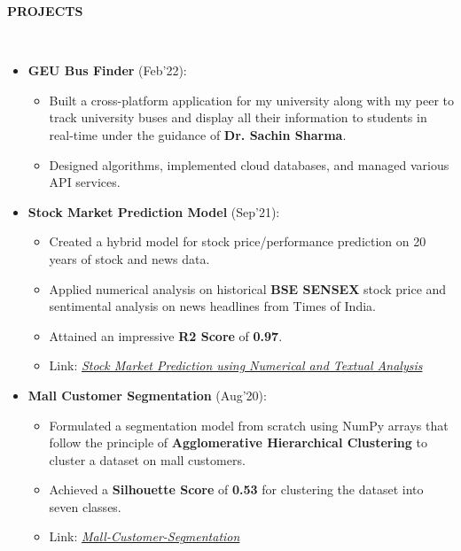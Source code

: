 \documentclass[a4paper,10pt]{article}
\newcommand{\lsep}{-0.5cm}
\newcommand{\resheading}[1]{{\small \colorbox{mygrey}{\begin{minipage}{0.98\textwidth}{\textbf{#1 \vphantom{p\^{E}}}}\end{minipage}}}}
\begin{document}
\resheading{\textbf{PROJECTS} }\\[\lsep]
\begin{itemize}[itemsep=0.01mm, parsep=0.1pt]

\item \textbf{GEU Bus Finder} (Feb'22): 
\begin{itemize}[itemsep=0.01mm, parsep=2pt]
\item Built a cross-platform application for my university along with my peer to track university buses and display all their information to students in real-time under the guidance of \textbf{Dr. Sachin Sharma}.
\item Designed algorithms, implemented cloud databases, and managed various API services.
\end{itemize}

\item \textbf{Stock Market Prediction Model} (Sep'21): 
\begin{itemize}[itemsep=0.01mm, parsep=2pt]
\item Created a hybrid model for stock price/performance prediction on 20 years of stock and news data.
\item Applied numerical analysis on historical \textbf{BSE SENSEX} stock price and sentimental analysis on news headlines from Times of India. 
\item Attained an impressive \textbf{R2 Score} of \textbf{0.97}.
\item Link: \href{https://github.com/Ash20vyas/TSF-Intern-Tasks/tree/main/%232%20-%20Stock%20Market%20Prediction%20using%20Numerical%20and%20Textual%20Analysis} {\textit{Stock Market Prediction using Numerical and Textual Analysis}}
\end{itemize}

\item \textbf{Mall Customer Segmentation} (Aug'20): \begin{itemize}[itemsep=0.01mm, parsep=0.01pt]
\item Formulated a segmentation model from scratch using NumPy arrays that follow the principle of \textbf{Agglomerative Hierarchical Clustering} to cluster a dataset on mall customers. 
\item Achieved a \textbf{Silhouette Score} of \textbf{0.53} for clustering the dataset into seven classes.
\item Link: \href{https://github.com/Ash20vyas/Mall-Customer-Segmentation} {\textit{Mall-Customer-Segmentation}}
\end{itemize}

\end{itemize}
\end{document}
